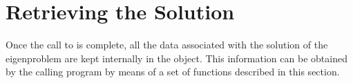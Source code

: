 
\section{Retrieving the Solution}
\label{sec:retrsol}

Once the call to  is complete, all the data associated with the solution of the eigenproblem are kept internally in the  object. This information can be obtained by the calling program by means of a set of functions described in this section.

